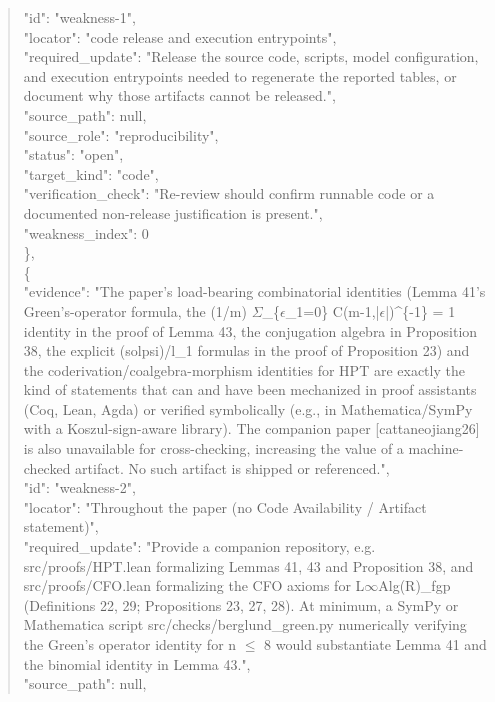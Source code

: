 \documentclass[11pt]{article}
\begin{document}
\begin{quote}
      "id": "weakness-1",\\
      "locator": "code release and execution entrypoints",\\
      "required\_update": "Release the source code, scripts, model configuration, and execution entrypoints needed to regenerate the reported tables, or document why those artifacts cannot be released.",\\
      "source\_path": null,\\
      "source\_role": "reproducibility",\\
      "status": "open",\\
      "target\_kind": "code",\\
      "verification\_check": "Re-review should confirm runnable code or a documented non-release justification is present.",\\
      "weakness\_index": 0\\
    \},\\
    \{\\
      "evidence": "The paper's load-bearing combinatorial identities (Lemma 41's Green's-operator formula, the (1/m) \ensuremath{\Sigma}\_\{\ensuremath{\epsilon}\_1=0\} C(m-1,|\ensuremath{\epsilon}|)\^{}\{-1\} = 1 identity in the proof of Lemma 43, the conjugation algebra in Proposition 38, the explicit (solpsi)/l\_1 formulas in the proof of Proposition 23) and the coderivation/coalgebra-morphism identities for HPT are exactly the kind of statements that can and have been mechanized in proof assistants (Coq, Lean, Agda) or verified symbolically (e.g., in Mathematica/SymPy with a Koszul-sign-aware library). The companion paper [cattaneojiang26] is also unavailable for cross-checking, increasing the value of a machine-checked artifact. No such artifact is shipped or referenced.",\\
      "id": "weakness-2",\\
      "locator": "Throughout the paper (no Code Availability / Artifact statement)",\\
      "required\_update": "Provide a companion repository, e.g. src/proofs/HPT.lean formalizing Lemmas 41, 43 and Proposition 38, and src/proofs/CFO.lean formalizing the CFO axioms for L\ensuremath{\infty}Alg(R)\_fgp (Definitions 22, 29; Propositions 23, 27, 28). At minimum, a SymPy or Mathematica script src/checks/berglund\_green.py numerically verifying the Green's operator identity for n \ensuremath{\le} 8 would substantiate Lemma 41 and the binomial identity in Lemma 43.",\\
      "source\_path": null,\\

\end{quote}
\end{document}
